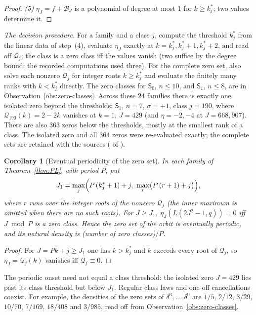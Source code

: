 \documentclass[11pt]{article}
\newtheorem{corollary}[theorem]{Corollary}
\theoremstyle{definition}
\begin{document}
\begin{proof}
\emph{(5)} $\eta_J=f+\mathcal B_J$ is a polynomial of degree at most $1$
for $k\geq k^*_j$; two values determine it.
\end{proof}

\emph{The decision procedure.}  For a family and a class $j$, compute
the threshold $k^*_j$ from the linear data of step~(4), evaluate
$\eta_J$ exactly at $k=k^*_j,k^*_j+1,k^*_j+2$, and read off
$\mathcal Q_j$; the class is a zero class iff the values vanish (two
suffice by the degree bound; the recorded computations used three).
For the complete zero set, also solve each nonzero $\mathcal Q_j$ for
integer roots $k\geq k^*_j$ and evaluate the finitely many ranks with
$k<k^*_j$ directly.  The zero classes for $\mathsf S_0$, $n\leq10$, and
$\mathsf S_1$, $n\leq8$, are in Observation~\ref{obs:zero-classes}.
Across these $24$ families there is exactly one isolated zero beyond the
thresholds: $\mathsf S_1$, $n=7$, $\sigma=+1$, class $j=190$, where
$\mathcal Q_{190}(k)=2-2k$ vanishes at $k=1$, $J=429$ (and
$\eta=-2,-4$ at $J=668,907$).  There are also $363$ zeros below the
thresholds, mostly at the smallest rank of a class.  The isolated zero
and all $364$ zeros were re-evaluated exactly;
the complete sets are retained with the sources
( of \cite{LCrecord}).

\begin{corollary}[Eventual periodicity of the zero set]
\label{cor:eventual}
In each family of Theorem~\ref{thm:PL}, with period $P$, put
\[
 J_1=\max_j\Bigl(P\,(k^*_j+1)+j,\ \max_r\bigl(P\,(r+1)+j\bigr)\Bigr),
\]
where $r$ runs over the integer roots of the nonzero $\mathcal Q_j$ (the
inner maximum is omitted when there are no such roots).  For
$J\geq J_1$, $\eta_J(L(2J^2-1,q))=0$ iff $J\bmod P$ is a zero class.
Hence the zero set of the orbit is eventually periodic, and its natural
density is (number of zero classes)$/P$.
\end{corollary}

\begin{proof}
For $J=Pk+j\geq J_1$ one has $k>k^*_j$ and $k$ exceeds every root of
$\mathcal Q_j$, so $\eta_J=\mathcal Q_j(k)$ vanishes iff
$\mathcal Q_j\equiv0$.
\end{proof}

The periodic onset need not equal a class threshold:
the isolated zero $J=429$ lies past its class threshold but below $J_1$.
Regular class laws and one-off cancellations coexist.  For example, the
densities of the zero sets of $\delta^3,\ldots,\delta^9$ are $1/5$,
$2/12$, $3/29$, $10/70$, $7/169$, $18/408$ and $3/985$, read off from
Observation~\ref{obs:zero-classes}.
\end{document}
